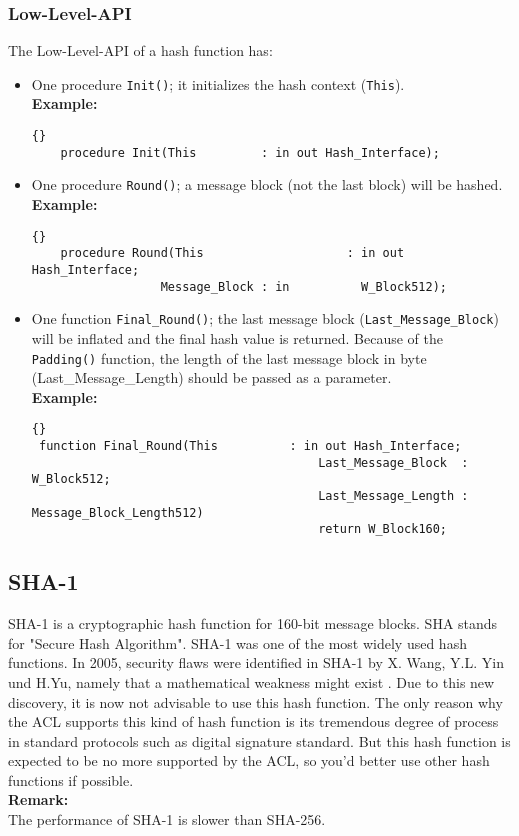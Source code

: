 \subsubsection*{Low-Level-API}
The Low-Level-API of a hash function has:
\begin{itemize}
\item One procedure \texttt{Init()}; it initializes the hash context (\texttt{This}).\\
\textbf{Example:}
\begin{lstlisting}{}
	procedure Init(This 		: in out Hash_Interface);
\end{lstlisting}
\item One procedure \texttt{Round()}; a message block (not the last block) will be hashed.\\
\textbf{Example:}
\begin{lstlisting}{}
	procedure Round(This 					: in out 	Hash_Interface;
                  Message_Block : in 		  W_Block512);
\end{lstlisting}
\item One function \texttt{Final\_Round()}; the last message block
  (\texttt{Last\_Message\_Block}) will be inflated and the final hash
  value is returned. Because of the \texttt{Padding()} function, the
  length of the last message block in byte (Last\_Message\_Length)
  should be passed as a parameter.\\

\noindent\textbf{Example:}
\begin{lstlisting}{}
 function Final_Round(This 		    : in out Hash_Interface;
										Last_Message_Block  : W_Block512;
										Last_Message_Length : Message_Block_Length512)
										return W_Block160;
\end{lstlisting}
\end{itemize}

\subsection{SHA-1}\label{SHA-1}
SHA-1 is a cryptographic hash function for 160-bit message blocks. SHA
stands for "Secure Hash Algorithm". SHA-1 was one of the most widely
used hash functions. In 2005, security flaws were identified in SHA-1
by X. Wang, Y.L. Yin und H.Yu, namely that a mathematical weakness
might exist \cite{DBLP:conf/crypto/WangYY05a}. Due to this new
discovery, it is now not advisable to use this hash function. The only
reason why the ACL supports this kind of hash function is its
tremendous degree of process in standard protocols such as digital
signature standard. But this hash function is expected to be no more
supported by the ACL, so you'd better use other hash functions if
possible. \\ \textbf{Remark:}\\ The performance of SHA-1 is slower
than SHA-256.

